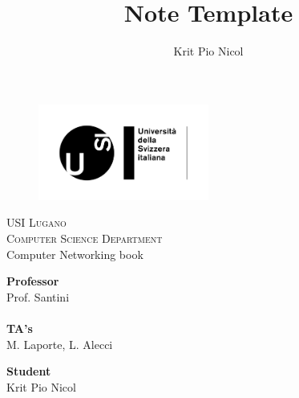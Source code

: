 \documentclass[a4paper]{report}
\author{Krit Pio Nicol}
\title{Note Template}
\begin{document}

\begin{titlepage}
\begin{figure}[t]
    \centering\includegraphics[width=0.5\textwidth]{Figures/usilogo.png}
\end{figure}

\begin{center}
    \textsc{\LARGE{USI Lugano\\}}
	\textsc{ \LARGE{Computer Science Department\\ }}
	\vspace{40mm}
	\fontsize{10mm}{7mm}\selectfont 
    \textup{Computer Networking book}\\
\end{center}

\vspace{25mm}

\begin{minipage}[t]{0.47\textwidth}
	\textnormal{\large{\bf Professor\\}}
	{\large Prof. Santini\\ \\}
 \textnormal{\large{\bf TA's\\}}
	{\large M. Laporte, L. Alecci}
\end{minipage}\hfill\begin{minipage}[t]{0.47\textwidth}\raggedleft
	\textnormal{\large{\bf Student\\}}
	{\large Krit Pio Nicol}
\end{minipage}

\vspace{20mm}


\end{titlepage}
\end{document}
